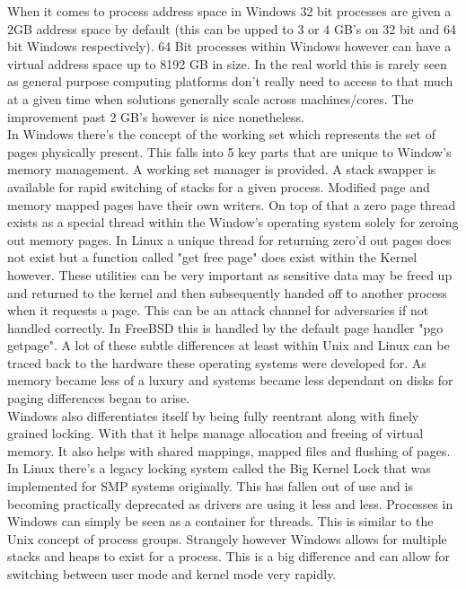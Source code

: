 \documentclass[letterpaper,10pt,draftclsnofoot,onecolumn]{IEEEtran}
\begin{document}

When it comes to process address space in Windows 32 bit processes are given a 2GB address space by default (this can be upped to 3 or 4 GB’s on 32 bit and 64 bit Windows respectively). 64 Bit processes within Windows however can have a virtual address space up to 8192 GB in size. In the real world this is rarely seen as general purpose computing platforms don’t really need to access to that much at a given time when solutions generally scale across machines/cores. The improvement past 2 GB’s however is nice nonetheless.\\
In Windows there's the concept of the working set which represents the set of pages physically present. This falls into 5 key parts that are unique to Window’s memory management. A working set manager is provided. A stack swapper is available for rapid switching of stacks for a given process. Modified page and memory mapped pages have their own writers. On top of that a zero page thread exists as a special thread within the Window’s operating system solely for zeroing out memory pages. In Linux a unique thread for returning zero’d out pages does not exist but a function called "get free page" does exist within the Kernel however. \cite{love} These utilities can be very important as sensitive data may be freed up and returned to the kernel and then subsequently handed off to another process when it requests a page. This can be an attack channel for adversaries if not handled correctly. In FreeBSD this is handled by the default page handler "pgo getpage". \cite{mccusick} A lot of these subtle differences at least within Unix and Linux can be traced back to the hardware these operating systems were developed for. As memory became less of a luxury and systems became less dependant on disks for paging differences began to arise.\\
Windows also differentiates itself by being fully reentrant along with finely grained locking. With that it helps manage allocation and freeing of virtual memory. It also helps with shared mappings, mapped files and flushing of pages. In Linux there's a legacy locking system called the Big Kernel Lock that was implemented for SMP systems originally. This has fallen out of use and is becoming practically deprecated as drivers are using it less and less. \cite{love} Processes in Windows can simply be seen as a container for threads. This is similar to the Unix concept of process groups. Strangely however Windows allows for multiple stacks and heaps to exist for a process. This is a big difference and can allow for switching between user mode and kernel mode very rapidly.\\
\end{document}
